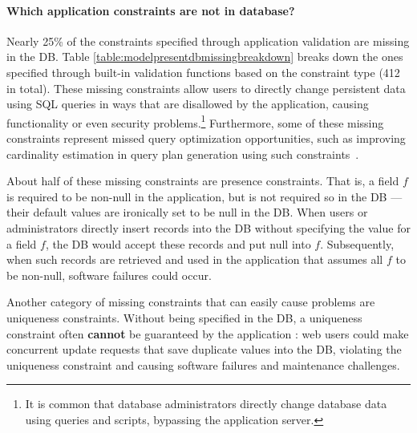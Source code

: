 \paragraph{\bf Which application constraints are not in database?}
Nearly 25\% of the constraints specified through application validation are missing in the DB.  
Table \ref{table:modelpresentdbmissingbreakdown}
breaks down the ones specified through built-in validation 
functions based on the constraint type
(412 in total). 
These missing constraints allow users to directly
change persistent data using SQL queries in ways that are disallowed by the application, causing functionality or even security problems.\footnote{It is common that database administrators directly change database data using queries and scripts, bypassing the application server.} Furthermore, some of these missing constraints represent missed query optimization opportunities, such as improving cardinality estimation in query plan generation using such constraints~\cite{lohmanBlog}.

About half of these missing constraints
are presence constraints. That is, a field $f$ is required to be non-null in the application, but is not required so in the DB --- their default values are ironically set to be null in the DB. 
When users or administrators directly insert records into the DB without specifying the value
for a field $f$, the DB would accept these records and put null into $f$. 
Subsequently, when such records are retrieved and used in the application that 
assumes all $f$ to be non-null, software failures could occur.

Another category of missing constraints that can easily cause problems are uniqueness constraints. Without being
specified in the DB, a uniqueness constraint often {\bf cannot} be guaranteed by the application \cite{perilsofuniqueness,uniquenessrb}: 
web users could make concurrent update requests that save duplicate values into the DB, violating the uniqueness constraint and causing software failures and maintenance challenges. 


